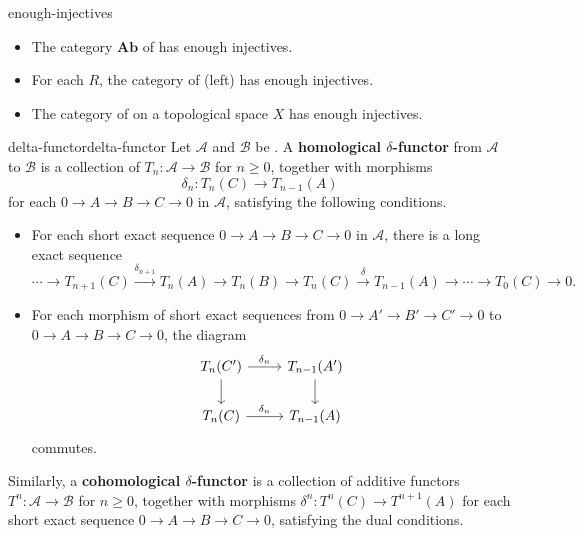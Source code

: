\begin{example}{enough-injectives}
    \begin{itemize}
        \item The category $\textbf{Ab}$ of  has enough injectives.
        \item For each  $R$, the category of (left)  has enough injectives.
        \item The category of  on a topological space $X$ has enough injectives.
    \end{itemize}
\end{example}

\begin{topic}{delta-functor}{delta-functor}
    Let $\mathcal{A}$ and $\mathcal{B}$ be . A \textbf{homological $\delta$-functor} from $\mathcal{A}$ to $\mathcal{B}$ is a collection of  $T_n : \mathcal{A} \to \mathcal{B}$ for $n \ge 0$, together with morphisms
    \[ \delta_n : T_n(C) \to T_{n - 1}(A) \]
    for each  $0 \to A \to B \to C \to 0$ in $\mathcal{A}$, satisfying the following conditions.
    \begin{itemize}
        \item For each short exact sequence $0 \to A \to B \to C \to 0$ in $\mathcal{A}$, there is a long exact sequence
        \[ \cdots \to T_{n + 1}(C) \xrightarrow{\delta_{n + 1}} T_n(A) \to T_n(B) \to T_n(C) \xrightarrow{\delta} T_{n - 1}(A) \to \cdots \to T_0(C) \to 0 . \]
        \item For each morphism of short exact sequences from $0 \to A' \to B' \to C' \to 0$ to $0 \to A \to B \to C \to 0$, the diagram
        \[ \begin{tikzcd} T_n(C') \arrow{r}{\delta_n} \arrow{d} & T_{n - 1}(A') \arrow{d} \\ T_n(C) \arrow{r}{\delta_n} & T_{n - 1}(A) \end{tikzcd} \]
        commutes.
    \end{itemize}
    Similarly, a \textbf{cohomological $\delta$-functor} is a collection of additive functors $T^n : \mathcal{A} \to \mathcal{B}$ for $n \ge 0$, together with morphisms $\delta^n : T^n(C) \to T^{n + 1}(A)$ for each short exact sequence $0 \to A \to B \to C \to 0$, satisfying the dual conditions.
\end{topic}

